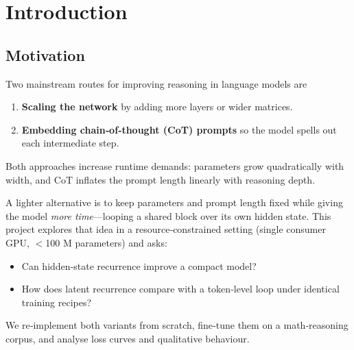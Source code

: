 \chapter{Introduction}\label{ch:intro}

\section{Motivation}

Two mainstream routes for improving reasoning in language models are

\begin{enumerate}
    \item \textbf{Scaling the network} by adding more layers or wider
          matrices.
    \item \textbf{Embedding chain‑of‑thought (CoT) prompts} so the model
          spells out each intermediate step.
\end{enumerate}

Both approaches increase runtime demands: parameters grow quadratically
with width, and CoT inflates the prompt length linearly with reasoning
depth.

A lighter alternative is to keep parameters and prompt length fixed while
giving the model \emph{more time}—looping a shared block over its own hidden
state.  This project explores that idea in a resource‑constrained setting
(single consumer GPU, $<$100 M parameters) and asks:

\begin{itemize}
    \item Can hidden‑state recurrence improve a compact model?
    \item How does latent recurrence compare with a token‑level loop under
          identical training recipes?
\end{itemize}

We re‑implement both variants from scratch, fine‑tune them on a
math‑reasoning corpus, and analyse loss curves and qualitative behaviour.

